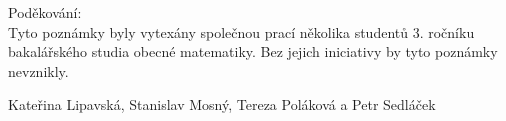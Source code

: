 \newpage
Poděkování:\\

Tyto poznámky byly vytexány společnou prací několika studentů 3. ročníku bakalářského studia obecné matematiky. Bez jejich iniciativy by tyto poznámky nevznikly. \\

\begin{flushright}
Kateřina Lipavská, Stanislav Mosný, Tereza Poláková a Petr Sedláček
\end{flushright}
